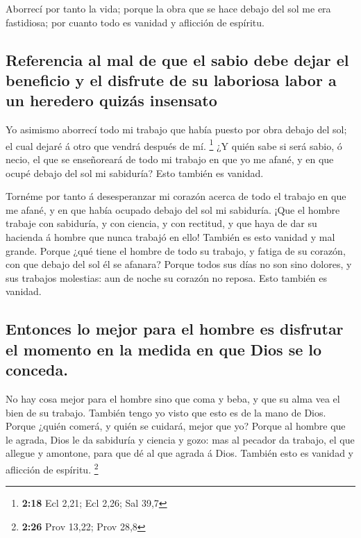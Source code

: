  Aborrecí por tanto la vida; porque la obra que se hace
debajo del sol me era fastidiosa; por cuanto todo es vanidad y aflicción
de espíritu.

\hypertarget{referencia-al-mal-de-que-el-sabio-debe-dejar-el-beneficio-y-el-disfrute-de-su-laboriosa-labor-a-un-heredero-quizuxe1s-insensato}{%
\subsection{Referencia al mal de que el sabio debe dejar el beneficio y
el disfrute de su laboriosa labor a un heredero quizás
insensato}\label{referencia-al-mal-de-que-el-sabio-debe-dejar-el-beneficio-y-el-disfrute-de-su-laboriosa-labor-a-un-heredero-quizuxe1s-insensato}}

 Yo asimismo aborrecí todo mi trabajo que había puesto
por obra debajo del sol; el cual dejaré á otro que vendrá después de mí.
\footnote{\textbf{2:18} Ecl 2,21; Ecl 2,26; Sal 39,7}  ¿Y
quién sabe si será sabio, ó necio, el que se enseñoreará de todo mi
trabajo en que yo me afané, y en que ocupé debajo del sol mi sabiduría?
Esto también es vanidad.

 Tornéme por tanto á desesperanzar mi corazón acerca de
todo el trabajo en que me afané, y en que había ocupado debajo del sol
mi sabiduría.  ¡Que el hombre trabaje con sabiduría, y
con ciencia, y con rectitud, y que haya de dar su hacienda á hombre que
nunca trabajó en ello! También es esto vanidad y mal grande.
 Porque ¿qué tiene el hombre de todo su trabajo, y fatiga
de su corazón, con que debajo del sol él se afanara? 
Porque todos sus días no son sino dolores, y sus trabajos molestias: aun
de noche su corazón no reposa. Esto también es vanidad.

\hypertarget{entonces-lo-mejor-para-el-hombre-es-disfrutar-el-momento-en-la-medida-en-que-dios-se-lo-conceda.}{%
\subsection{Entonces lo mejor para el hombre es disfrutar el momento en
la medida en que Dios se lo
conceda.}\label{entonces-lo-mejor-para-el-hombre-es-disfrutar-el-momento-en-la-medida-en-que-dios-se-lo-conceda.}}

 No hay cosa mejor para el hombre sino que coma y beba, y
que su alma vea el bien de su trabajo. También tengo yo visto que esto
es de la mano de Dios.  Porque ¿quién comerá, y quién se
cuidará, mejor que yo?  Porque al hombre que le agrada,
Dios le da sabiduría y ciencia y gozo: mas al pecador da trabajo, el que
allegue y amontone, para que dé al que agrada á Dios. También esto es
vanidad y aflicción de espíritu. \footnote{\textbf{2:26} Prov 13,22;
  Prov 28,8}

